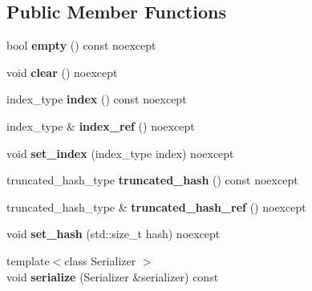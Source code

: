 \subsection*{Public Member Functions}
\begin{DoxyCompactItemize}
\item 
\mbox{\label{classtsl_1_1detail__ordered__hash_1_1bucket__entry_a6b5c833e49d58772e587ee04856cdd04}} 
bool {\bfseries empty} () const noexcept
\item 
\mbox{\label{classtsl_1_1detail__ordered__hash_1_1bucket__entry_a1385e3151af674c73667d46bebd11891}} 
void {\bfseries clear} () noexcept
\item 
\mbox{\label{classtsl_1_1detail__ordered__hash_1_1bucket__entry_a0e104fb2cc41f26e8a5a5f65d84d1f88}} 
index\+\_\+type {\bfseries index} () const noexcept
\item 
\mbox{\label{classtsl_1_1detail__ordered__hash_1_1bucket__entry_aca1503b55a0883d5f74214e4f1cf165d}} 
index\+\_\+type \& {\bfseries index\+\_\+ref} () noexcept
\item 
\mbox{\label{classtsl_1_1detail__ordered__hash_1_1bucket__entry_abc46ae9e0dacde8b6654db5ea59aa058}} 
void {\bfseries set\+\_\+index} (index\+\_\+type index) noexcept
\item 
\mbox{\label{classtsl_1_1detail__ordered__hash_1_1bucket__entry_a7c0f35febd94bf54b12a440e2cfd076e}} 
truncated\+\_\+hash\+\_\+type {\bfseries truncated\+\_\+hash} () const noexcept
\item 
\mbox{\label{classtsl_1_1detail__ordered__hash_1_1bucket__entry_affa6ce73df4e2b6c7642284ce05cfe9f}} 
truncated\+\_\+hash\+\_\+type \& {\bfseries truncated\+\_\+hash\+\_\+ref} () noexcept
\item 
\mbox{\label{classtsl_1_1detail__ordered__hash_1_1bucket__entry_a0d5533c1744dbf882c94592f46cde412}} 
void {\bfseries set\+\_\+hash} (std\+::size\+\_\+t hash) noexcept
\item 
\mbox{\label{classtsl_1_1detail__ordered__hash_1_1bucket__entry_a566a0eca96bd424303445f564285e755}} 
{\footnotesize template$<$class Serializer $>$ }\\void {\bfseries serialize} (Serializer \&serializer) const
\end{DoxyCompactItemize}
